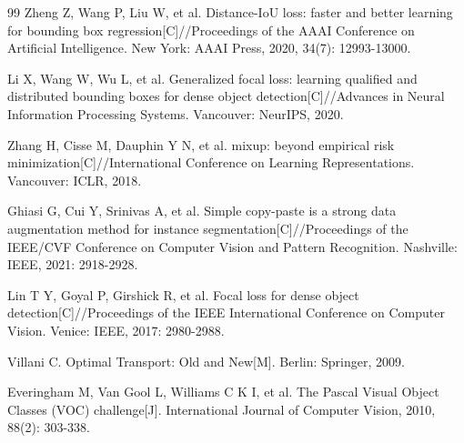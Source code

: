 \begin{thebibliography}{99}
 Zheng Z, Wang P, Liu W, et al. Distance-IoU loss: faster and better learning for bounding box regression[C]//Proceedings of the AAAI Conference on Artificial Intelligence. New York: AAAI Press, 2020, 34(7): 12993-13000.

 Li X, Wang W, Wu L, et al. Generalized focal loss: learning qualified and distributed bounding boxes for dense object detection[C]//Advances in Neural Information Processing Systems. Vancouver: NeurIPS, 2020.

 Zhang H, Cisse M, Dauphin Y N, et al. mixup: beyond empirical risk minimization[C]//International Conference on Learning Representations. Vancouver: ICLR, 2018.

 Ghiasi G, Cui Y, Srinivas A, et al. Simple copy-paste is a strong data augmentation method for instance segmentation[C]//Proceedings of the IEEE/CVF Conference on Computer Vision and Pattern Recognition. Nashville: IEEE, 2021: 2918-2928.

 Lin T Y, Goyal P, Girshick R, et al. Focal loss for dense object detection[C]//Proceedings of the IEEE International Conference on Computer Vision. Venice: IEEE, 2017: 2980-2988.

 Villani C. Optimal Transport: Old and New[M]. Berlin: Springer, 2009.

 Everingham M, Van Gool L, Williams C K I, et al. The Pascal Visual Object Classes (VOC) challenge[J]. International Journal of Computer Vision, 2010, 88(2): 303-338.

\end{thebibliography}
